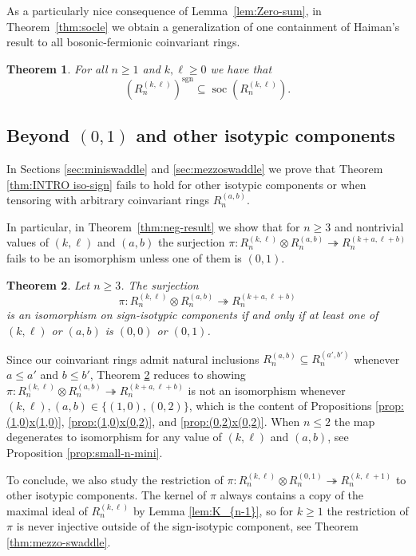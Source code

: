 \documentclass[11pt, reqno]{amsart}
\newtheorem{introthm}{Theorem}
\theoremstyle{definition}
\theoremstyle{remark}
\numberwithin{equation}{section}
\newcommand{\0}{\emptyset}
\DeclareMathOperator{\sgn}{sgn}
\DeclareMathOperator{\soc}{soc}
\begin{document}
As a particularly nice consequence of Lemma~\ref{lem:Zero-sum}, in Theorem~\ref{thm:socle} we obtain a generalization of one containment of Haiman's result to all bosonic-fermionic coinvariant rings.

\begin{introthm}\label{thm:INTRO socle} For all $n\geq 1$ and $k,\ell \geq 0$ we have that
    \[\left(R_n^{(k,\ell)}\right)^{\sgn} \subseteq \soc\left(R_n^{(k,\ell)}\right).\]
\end{introthm}

\subsection{Beyond $(0,1)$ and other isotypic components} In Sections \ref{sec:miniswaddle} and \ref{sec:mezzoswaddle} we prove that Theorem \ref{thm:INTRO iso-sign} fails to hold for other isotypic components or when tensoring with arbitrary coinvariant rings $R_n^{(a,b)}$. 

In particular, in Theorem~\ref{thm:neg-result} we show that for $n\geq 3$ and nontrivial values  
of $(k,\ell)$ and $(a,b)$ the surjection 
$\pi: R_{n}^{(k,\ell)} \otimes R_{n}^{(a,b)} \twoheadrightarrow R_{n}^{(k+a,\ell+b)}$ 
fails to be an isomorphism unless one of them is $(0,1)$. 

\begin{introthm}\label{thm:INTRO neg-result}
Let $n \geq 3$.
The surjection
\begin{equation*}
        \pi: R_{n}^{(k,\ell)} \otimes R_{n}^{(a,b)} \twoheadrightarrow R_{n}^{(k+a,\ell+b)}
    \end{equation*}
     is an isomorphism on sign-isotypic components if and only if 
     at least one of $(k,\ell)$ or $(a,b)$ is $(0,0)$ or $(0,1)$. 
\end{introthm}

Since our coinvariant rings admit natural inclusions $R_n^{(a,b)} \subseteq R_n^{(a',b')}$ whenever 
$a\leq a'$ and $b\leq b'$, Theorem \ref{thm:INTRO neg-result} reduces to showing 
$\pi: R_{n}^{(k,\ell)} \otimes R_{n}^{(a,b)} \twoheadrightarrow R_{n}^{(k+a,\ell+b)}$ 
is not an isomorphism whenever $(k,\ell), (a,b)\in \{(1,0), (0,2)\}$, 
which is the content of Propositions \ref{prop:(1,0)x(1,0)}, \ref{prop:(1,0)x(0,2)}, and \ref{prop:(0,2)x(0,2)}. 
When $n \leq 2$ the map degenerates to isomorphism for any value of 
$(k,\ell)$ and $(a,b)$, see Proposition \ref{prop:small-n-mini}. 

To conclude, we also study the restriction of $\pi: R_{n}^{(k,\ell)} \otimes R_{n}^{(0,1)} \twoheadrightarrow R_{n}^{(k,\ell+1)}$ to other isotypic components. 
The kernel of $\pi$ always contains a copy of the maximal ideal of $R_n^{(k,\ell)}$ by Lemma \ref{lem:K_{n-1}}, so for $k \geq 1$ the restriction of $\pi$ is never injective outside of the sign-isotypic component, see Theorem \ref{thm:mezzo-swaddle}.
\end{document}
